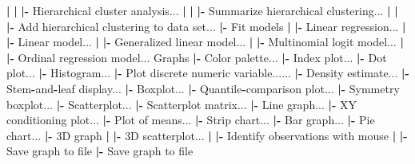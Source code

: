 \documentclass[12pt,]{krantz}
\newenvironment{Shaded}{\begin{snugshade}}{\end{snugshade}}
\newcommand{\ErrorTok}[1]{\textcolor[rgb]{0.64,0.00,0.00}{\textbf{#1}}}
\newcommand{\NormalTok}[1]{#1}
\newcommand{\OperatorTok}[1]{\textcolor[rgb]{0.81,0.36,0.00}{\textbf{#1}}}
\newcommand{\StringTok}[1]{\textcolor[rgb]{0.31,0.60,0.02}{#1}}
\begin{document}
\begin{Shaded}
\begin{Highlighting}[]
  \OperatorTok{|}\StringTok{ }\ErrorTok{|}\StringTok{ }\ErrorTok{|}\OperatorTok{-}\StringTok{ }\NormalTok{Hierarchical cluster analysis...}
  \OperatorTok{|}\StringTok{ }\ErrorTok{|}\StringTok{ }\ErrorTok{|}\OperatorTok{-}\StringTok{ }\NormalTok{Summarize hierarchical clustering...}
  \OperatorTok{|}\StringTok{ }\ErrorTok{|}\StringTok{ }\ErrorTok{|}\OperatorTok{-}\StringTok{ }\NormalTok{Add hierarchical clustering to data set...}
  \OperatorTok{|-}\StringTok{ }\NormalTok{Fit models}
  \OperatorTok{|}\StringTok{ }\ErrorTok{|}\OperatorTok{-}\StringTok{ }\NormalTok{Linear regression...}
  \OperatorTok{|}\StringTok{ }\ErrorTok{|}\OperatorTok{-}\StringTok{ }\NormalTok{Linear model...}
  \OperatorTok{|}\StringTok{ }\ErrorTok{|}\OperatorTok{-}\StringTok{ }\NormalTok{Generalized linear model...}
  \OperatorTok{|}\StringTok{ }\ErrorTok{|}\OperatorTok{-}\StringTok{ }\NormalTok{Multinomial logit model...}
  \OperatorTok{|}\StringTok{ }\ErrorTok{|}\OperatorTok{-}\StringTok{ }\NormalTok{Ordinal regression model...}
\NormalTok{Graphs}
  \OperatorTok{|-}\StringTok{ }\NormalTok{Color palette...}
  \OperatorTok{|-}\StringTok{ }\NormalTok{Index plot...}
  \OperatorTok{|-}\StringTok{ }\NormalTok{Dot plot...}
  \OperatorTok{|-}\StringTok{ }\NormalTok{Histogram...}
  \OperatorTok{|-}\StringTok{ }\NormalTok{Plot discrete numeric variable......}
  \OperatorTok{|-}\StringTok{ }\NormalTok{Density estimate...}
  \OperatorTok{|-}\StringTok{ }\NormalTok{Stem}\OperatorTok{-}\NormalTok{and}\OperatorTok{-}\NormalTok{leaf display...}
  \OperatorTok{|-}\StringTok{ }\NormalTok{Boxplot...}
  \OperatorTok{|-}\StringTok{ }\NormalTok{Quantile}\OperatorTok{-}\NormalTok{comparison plot...}
  \OperatorTok{|-}\StringTok{ }\NormalTok{Symmetry boxplot...}
  \OperatorTok{|-}\StringTok{ }\NormalTok{Scatterplot...}
  \OperatorTok{|-}\StringTok{ }\NormalTok{Scatterplot matrix...}
  \OperatorTok{|-}\StringTok{ }\NormalTok{Line graph...}
  \OperatorTok{|-}\StringTok{ }\NormalTok{XY conditioning plot...}
  \OperatorTok{|-}\StringTok{ }\NormalTok{Plot of means...}
  \OperatorTok{|-}\StringTok{ }\NormalTok{Strip chart...}
  \OperatorTok{|-}\StringTok{ }\NormalTok{Bar graph...}
  \OperatorTok{|-}\StringTok{ }\NormalTok{Pie chart...}
  \OperatorTok{|-}\StringTok{ }\NormalTok{3D graph}
  \OperatorTok{|}\StringTok{ }\ErrorTok{|}\OperatorTok{-}\StringTok{ }\NormalTok{3D scatterplot...}
  \OperatorTok{|}\StringTok{ }\ErrorTok{|}\OperatorTok{-}\StringTok{ }\NormalTok{Identify observations with mouse}
  \OperatorTok{|}\StringTok{ }\ErrorTok{|}\OperatorTok{-}\StringTok{ }\NormalTok{Save graph to file}
  \OperatorTok{|-}\StringTok{ }\NormalTok{Save graph to file}

\end{Highlighting}
\end{Shaded}
\end{document}
